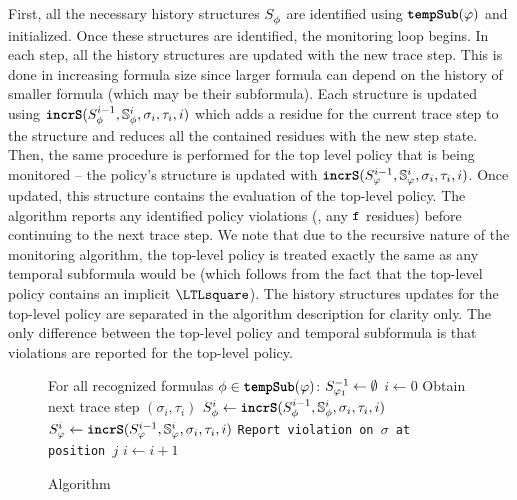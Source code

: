 First, all the necessary history structures $\histst[\policyv]{ }$ are identified using $\tempSub(\policy)$ and initialized. 
Once these structures are identified, the monitoring loop begins.
%
In each step, all the history structures are updated with the new trace step. 
This is done in increasing formula size since larger formula can depend on the history of smaller formula (which may be their subformula).
%
Each structure is updated using $\incrS(\histst[\policyv]{i-1},\histSt[\policyv]{i}, \sigma_i, \tau_i, i)$ which adds a residue for the current trace step to the structure and reduces all the contained residues with the new step state. 
Then, the same procedure is performed for the top level policy that is being monitored -- the policy's structure is updated with $\incrS(\histst{i-1},\histSt{i},\sigma_i,\tau_i, i)$.
Once updated, this structure contains the evaluation of the top-level policy. The algorithm reports any identified policy violations (\ie, any $\false$ residues) before continuing to the next trace step.
%
We note that due to the recursive nature of the monitoring algorithm, the top-level policy is treated exactly the same as any temporal subformula would be (which follows from the fact that the top-level policy contains an implicit $\henceforth$). 
The history structures updates for the top-level policy are separated in the algorithm description for clarity only.
The only difference between the top-level policy and temporal subformula is that violations are reported for the top-level policy. 

\begin{figure}
\begin{algorithmic}[1]
\STATE For all recognized formulas $\policyv \in \tempSub(\policy)$: $\histst[\policy_1]{-1} \leftarrow \emptyset$
\STATE $i \leftarrow 0$
\LOOP
\STATE Obtain next trace step $(\sigma_i, \tau_i)$ 
	\STATE $\histst[\policyv]{i} \leftarrow \incrS(\histst[\policyv]{i-1}, \histSt[\policyv]{i}, \sigma_i, \tau_i, i)$
\ENDFOR
\STATE $\histst{i} \leftarrow \incrS(\histst{i-1}, \histSt{i}, \sigma_i, \tau_i, i)$
\STATE \texttt{Report violation on $\sigma$ at position $j$}
\ENDFOR
\STATE $i \leftarrow i + 1$
\ENDLOOP
\end{algorithmic}
\caption{\monitor Algorithm}\label{fig:algorithm}
\end{figure}

